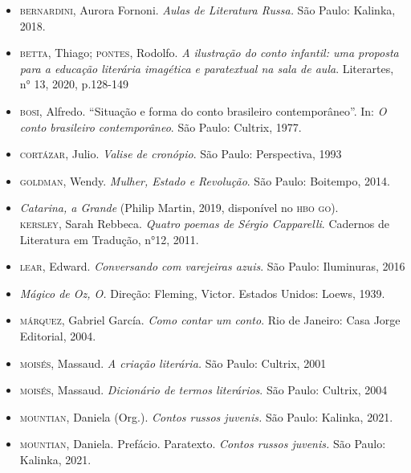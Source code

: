 \documentclass[11pt]{extarticle}
\begin{document}
\begin{itemize}
\item[]\textsc{bernardini}, Aurora Fornoni. \emph{Aulas de Literatura Russa.}
São Paulo: Kalinka, 2018.

\item[]\textsc{betta}, Thiago; \textsc{pontes}, Rodolfo. \emph{A ilustração do conto infantil:
uma proposta para a educação literária imagética e paratextual na sala
de aula}. Literartes, n° 13, 2020, p.128-149

\item[]\textsc{bosi}, Alfredo. ``Situação e forma do conto brasileiro contemporâneo''.
In: \emph{O conto brasileiro contemporâneo}. São Paulo: Cultrix, 1977.

\item[]\textsc{cortázar}, Julio. \emph{Valise de cronópio}. São Paulo: Perspectiva, 1993

\item[]\textsc{goldman}, Wendy. \emph{Mulher, Estado e Revolução}. São Paulo: Boitempo,
2014.

\item[]\emph{Catarina, a Grande} (Philip Martin, 2019, disponível no \textsc{hbo go}).\\
\textsc{kersley}, Sarah Rebbeca. \emph{Quatro poemas de Sérgio Capparelli}.
Cadernos de Literatura em Tradução, n°12, 2011.

\item[]\textsc{lear}, Edward. \emph{Conversando com varejeiras azuis}. São Paulo:
Iluminuras, 2016

\item[]\emph{Mágico de Oz, O.} Direção: Fleming, Victor. Estados Unidos: Loews,
1939.

\item[]\textsc{márquez}, Gabriel García. \emph{Como contar um conto}. Rio de Janeiro:
Casa Jorge Editorial, 2004.

\item[]\textsc{moisés}, Massaud. \emph{A criação literária.} São Paulo: Cultrix, 2001

\item[]\textsc{moisés}, Massaud. \emph{Dicionário de termos literários}. São Paulo:
Cultrix, 2004

\item[]\textsc{mountian}, Daniela (Org.). \emph{Contos russos juvenis.} São Paulo:
Kalinka, 2021.

\item[]\textsc{mountian}, Daniela. Prefácio. Paratexto. \emph{Contos russos juvenis.}
São Paulo: Kalinka, 2021.


\end{itemize}
\end{document}

